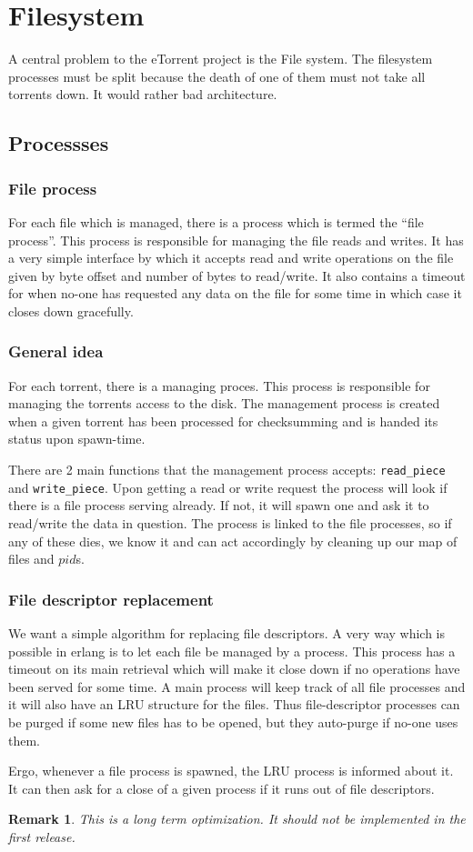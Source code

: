 \documentclass[a4paper]{report}
\newtheorem{remark}{Remark}
\begin{document}
\section{Filesystem}
A central problem to the eTorrent project is the File system. The
filesystem processes must be split because the death of one of them
must not take all torrents down. It would rather bad architecture.

\subsection{Processses}
\subsubsection{File process}
For each file which is managed, there is a process which is termed the
``file process''. This process is responsible for managing the file
reads and writes. It has a very simple interface by which it accepts
read and write operations on the file given by byte offset and number
of bytes to read/write. It also contains a timeout for when no-one has
requested any data on the file for some time in which case it closes
down gracefully.

\subsubsection{General idea}
For each torrent, there is a managing proces. This process is
responsible for managing the torrents access to the disk. The
management process is created when a given torrent has been processed
for checksumming and is handed its status upon spawn-time.

There are 2 main functions that the management process accepts:
\texttt{read\_piece} and \texttt{write\_piece}. Upon getting a read or
write request the process will look if there is a file process serving
already. If not, it will spawn one and ask it to read/write the data
in question. The process is linked to the file processes, so if any of
these dies, we know it and can act accordingly by cleaning up our map
of files and $pid$s.

\subsubsection{File descriptor replacement}
We want a simple algorithm for replacing file descriptors. A very way
which is possible in erlang is to let each file be managed by a
process. This process has a timeout on its main retrieval which will
make it close down if no operations have been served for some time. A
main process will keep track of all file processes and it will also
have an LRU structure for the files. Thus file-descriptor processes can be
purged if some new files has to be opened, but they auto-purge if
no-one uses them.

Ergo, whenever a file process is spawned, the LRU process is informed
about it. It can then ask for a close of a given process if it runs
out of file descriptors.
\begin{remark}
  This is a long term optimization. It should not be implemented in
  the first release.
\end{remark}
\end{document}
